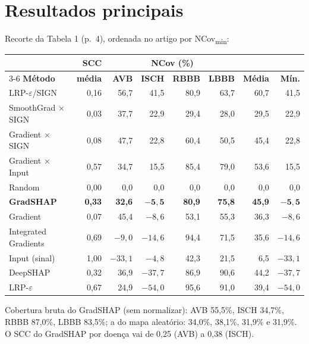 \documentclass[11pt,a4paper]{article}
\begin{document}
\section{Resultados principais}
Recorte da Tabela 1 (p.~4), ordenada no artigo por NCov\textsubscript{min}:
\begin{center}\small
\setlength{\tabcolsep}{4pt}
\begin{tabular}{lrrrrrrr}
\toprule
& \textbf{SCC} & \multicolumn{4}{c}{\textbf{NCov (\%)}} & & \\
\cmidrule(lr){3-6}
\textbf{Método} & \textbf{média} & \textbf{AVB} & \textbf{ISCH} & \textbf{RBBB} & \textbf{LBBB} & \textbf{Média} & \textbf{Mín.} \\
\midrule
LRP-$\varepsilon$/SIGN & 0,16 & 56,7 & 41,5 & 80,9 & 63,7 & 60,7 & 41,5 \\
SmoothGrad $\times$ SIGN & 0,03 & 37,7 & 22,9 & 29,4 & 28,0 & 29,5 & 22,9 \\
Gradient $\times$ SIGN & 0,08 & 47,7 & 22,8 & 60,4 & 50,5 & 45,4 & 22,8 \\
Gradient $\times$ Input & 0,57 & 34,7 & 15,5 & 85,4 & 79,0 & 53,6 & 15,5 \\
Random & 0,00 & 0,0 & 0,0 & 0,0 & 0,0 & 0,0 & 0,0 \\
\textbf{GradSHAP} & \textbf{0,33} & \textbf{32,6} & $\mathbf{-5{,}5}$ & \textbf{80,9} & \textbf{75,8} & \textbf{45,9} & $\mathbf{-5{,}5}$ \\
Gradient & 0,07 & 45,4 & $-8{,}6$ & 53,1 & 55,3 & 36,3 & $-8{,}6$ \\
Integrated Gradients & 0,69 & $-9{,}0$ & $-14{,}6$ & 94,4 & 71,5 & 35,6 & $-14{,}6$ \\
Input (sinal) & 1,00 & $-33{,}1$ & $-4{,}8$ & 42,3 & 21,5 & 6,5 & $-33{,}1$ \\
DeepSHAP & 0,32 & 36,9 & $-37{,}7$ & 86,9 & 90,6 & 44,2 & $-37{,}7$ \\
LRP-$\varepsilon$ & 0,67 & 24,9 & $-54{,}0$ & 95,6 & 91,0 & 39,4 & $-54{,}0$ \\
\bottomrule
\end{tabular}
\end{center}
Cobertura bruta do GradSHAP (sem normalizar): AVB 55,5\%, ISCH 34,7\%, RBBB 87,0\%, LBBB 83,5\%; a do mapa aleatório: 34,0\%, 38,1\%, 31,9\% e 31,9\%. O SCC do GradSHAP por doença vai de 0,25 (AVB) a 0,38 (ISCH).
\end{document}
